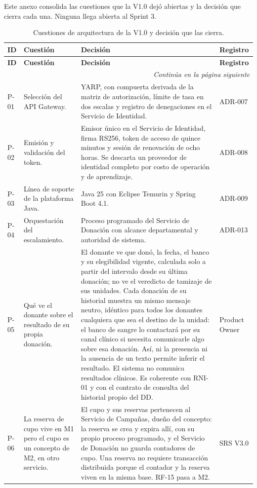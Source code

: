 \documentclass[11pt,a4paper]{article}
\newcommand{\contlinea}[1]{\multicolumn{#1}{r}{\footnotesize\itshape Continúa en la página siguiente}}
\begin{document}
Este anexo consolida las cuestiones que la V1.0 dejó abiertas y la decisión que cierra cada una. Ninguna llega abierta al Sprint 3.

\begin{longtable}{L{1.3cm} L{4.6cm} L{7.0cm} L{1.5cm}}
\caption{Cuestiones de arquitectura de la V1.0 y decisión que las cierra.}\label{tab:consolidadopendientes}\\
\toprule
\textbf{ID} & \textbf{Cuestión} & \textbf{Decisión} & \textbf{Registro} \\
\midrule
\endfirsthead
\toprule
\textbf{ID} & \textbf{Cuestión} & \textbf{Decisión} & \textbf{Registro} \\
\midrule
\endhead
\midrule
\contlinea{4} \\
\endfoot
\bottomrule
\endlastfoot
P-01 & Selección del API Gateway. & YARP, con compuerta derivada de la matriz de autorización, límite de tasa en dos escalas y registro de denegaciones en el Servicio de Identidad. & ADR-007 \\
P-02 & Emisión y validación del token. & Emisor único en el Servicio de Identidad, firma RS256, token de acceso de quince minutos y sesión de renovación de ocho horas. Se descarta un proveedor de identidad completo por costo de operación y de aprendizaje. & ADR-008 \\
P-03 & Línea de soporte de la plataforma Java. & Java 25 con Eclipse Temurin y Spring Boot 4.1. & ADR-009 \\
P-04 & Orquestación del escalamiento. & Proceso programado del Servicio de Donación con alcance departamental y autoridad de sistema. & ADR-013 \\
P-05 & Qué ve el donante sobre el resultado de su propia donación. & El donante ve que donó, la fecha, el banco y su elegibilidad vigente, calculada solo a partir del intervalo desde su última donación; no ve el veredicto de tamizaje de sus unidades. Cada donación de su historial muestra un mismo mensaje neutro, idéntico para todos los donantes cualquiera que sea el destino de la unidad: el banco de sangre lo contactará por su canal clínico si necesita comunicarle algo sobre esa donación. Así, ni la presencia ni la ausencia de un texto permite inferir el resultado. El sistema no comunica resultados clínicos. Es coherente con RNI-01 y con el contrato de consulta del historial propio del DD. & Product Owner \\
P-06 & La reserva de cupo vive en M1 pero el cupo es un concepto de M2, en otro servicio. & El cupo y sus reservas pertenecen al Servicio de Campañas, dueño del concepto: la reserva se crea y expira allí, con su propio proceso programado, y el Servicio de Donación no guarda contadores de cupo. Una reserva no requiere transacción distribuida porque el contador y la reserva viven en la misma base. RF-15 pasa a M2. & SRS V3.0 \\

\end{longtable}
\end{document}
